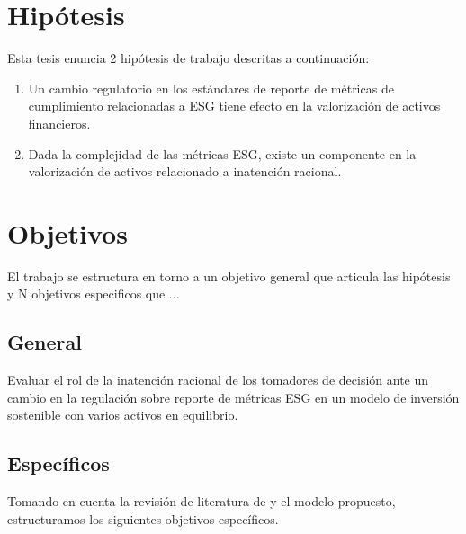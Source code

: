 \vspace{0.5cm}



\section{Hipótesis}

Esta tesis enuncia 2 hipótesis de trabajo descritas a continuación:

\begin{enumerate}
    \item Un cambio regulatorio en los estándares de reporte de métricas de cumplimiento relacionadas a ESG tiene efecto en la valorización de activos financieros. 
    \item Dada la complejidad de las métricas ESG, existe un componente en la valorización de activos relacionado a inatención racional.
\end{enumerate}

\section{Objetivos}

El trabajo se estructura en torno a un objetivo general que articula las hipótesis y N objetivos especificos que ...

\subsection{General} 

Evaluar el rol de la inatención racional de los tomadores de decisión ante un cambio en la regulación sobre reporte de métricas ESG en un modelo de inversión sostenible con varios activos en equilibrio.

\subsection{Específicos} 

Tomando en cuenta la revisión de literatura de \cite{pastor_sustainable_2021} y el modelo propuesto, estructuramos los siguientes objetivos específicos.

